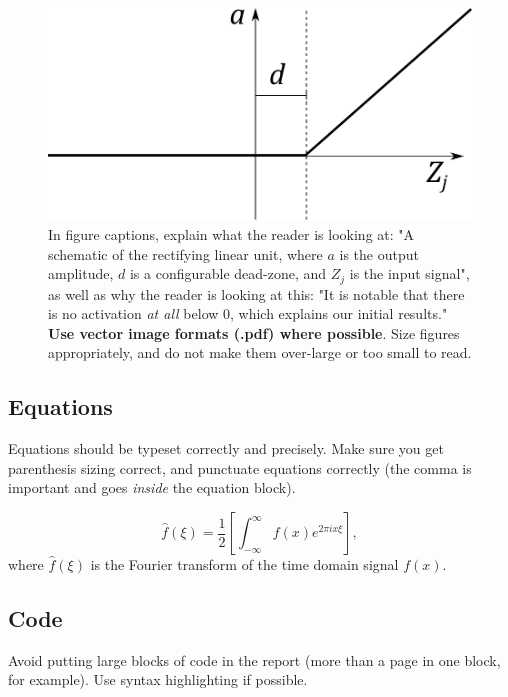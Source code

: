 \documentclass{l4proj}
\begin{document}
\begin{figure}
    \centering
    \includegraphics[width=0.5\linewidth]{images/relu.pdf}    

    \caption{In figure captions, explain what the reader is looking at: "A schematic of the rectifying linear unit, where $a$ is the output amplitude,
    $d$ is a configurable dead-zone, and $Z_j$ is the input signal", as well as why the reader is looking at this: 
    "It is notable that there is no activation \emph{at all} below 0, which explains our initial results." 
    \textbf{Use vector image formats (.pdf) where possible}. Size figures appropriately, and do not make them over-large or too small to read.
    }

    \label{fig:relu} 
\end{figure}

\subsection{Equations}

Equations should be typeset correctly and precisely. Make sure you get parenthesis sizing correct, and punctuate equations correctly 
(the comma is important and goes \textit{inside} the equation block).

\begin{equation}
    \hat{f}(\xi) = \frac{1}{2}\left[ \int_{-\infty}^{\infty} f(x) e^{2\pi i x \xi} \right],
\end{equation}    
where $\hat{f}(\xi)$ is the Fourier transform of the time domain signal $f(x)$.

\subsection{Code}

Avoid putting large blocks of code in the report (more than a page in one block, for example). Use syntax highlighting if possible.
\end{document}
